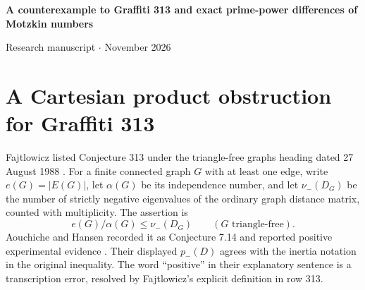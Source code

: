 \documentclass[11pt,a4paper]{article}
\begin{document}
\begin{center}
{\LARGE\bfseries\color{ink} A counterexample to Graffiti 313 and exact prime-power differences of Motzkin numbers\par}
\vspace{8pt}
{Research manuscript \enspace$\cdot$ November 2026}
\end{center}
\begin{abstract}
The Cartesian product of the Petersen graph and a square disproves
Graffiti conjecture 313, listed by Fajtlowicz under 27 August 1988. It has
40 vertices, 100 edges, independence number 14, and exactly seven negative
distance eigenvalues. For an
arbitrary connected graph $H$, multiplying by a crown graph makes the
ratio in the conjecture tend to $|V(H)|/b(H)$, where $b(H)$ is the
largest order of an induced bipartite subgraph. The ratio is unbounded
even on connected regular graphs and on explicit abelian Cayley graphs.
An independent arithmetic result settles the general-multiplier cases of
Lengyel's Conjecture~5.5. A binary coefficient identity and a ternary
expansion at a repeated root give the exact orders. On the ternary side,
the leading coefficient is nonzero for every fixed nonnegative offset,
giving an exact valuation formula for all multipliers prime to three.
\end{abstract}
\section{A Cartesian product obstruction for Graffiti 313}\label{sec:graffiti313}

Fajtlowicz listed Conjecture 313 under the triangle-free graphs heading dated
27 August 1988 \cite[p.~81]{fajt313}. For a finite connected graph $G$ with
at least one edge, write $e(G)=|E(G)|$, let $\alpha(G)$ be its independence
number, and let $\nu_-(D_G)$ be the number of strictly negative eigenvalues
of the ordinary graph distance matrix, counted with multiplicity. The assertion is
\begin{equation}\label{eq:313source}
             e(G)/\alpha(G)\le \nu_-(D_G) \qquad(G\text{ triangle-free}).
\end{equation}
Aouchiche and Hansen recorded it as Conjecture 7.14 and reported positive
experimental evidence \cite{ah313}. Their displayed $p_-(D)$ agrees with
the inertia notation in the original inequality. The word ``positive'' in their explanatory sentence is a
transcription error, resolved by Fajtlowicz's explicit definition in row 313.
\end{document}
